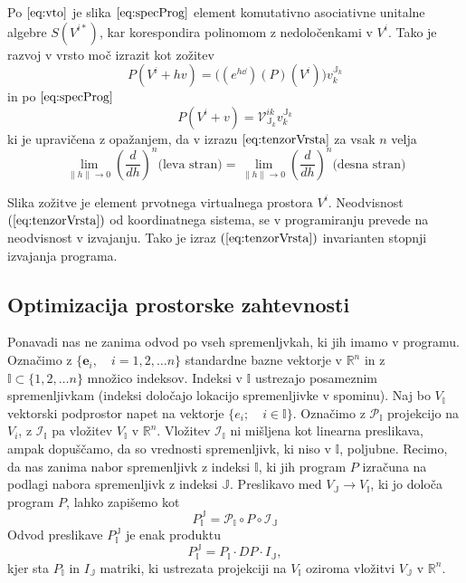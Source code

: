 \documentclass{article}
\newcommand{\RR}{\mathbb{R}}
\newcommand{\II}{\mathbb{I}}
\newcommand{\JJ}{\mathbb{J}}
\newcommand{\VV}{\mathcal{V}}
\newcommand{\e}{\mathbf{e}}
\begin{document}
  Po $\eqref{eq:vto}$ je slika $\eqref{eq:specProg}$ element komutativno asociativne unitalne algebre $S(V^{i*})$, kar korespondira polinomom z nedoločenkami v $V^i$. Tako je razvoj v vrsto moč izrazit kot zožitev
  \begin{equation}\label{eq:tenzorVrsta}
  	P(V^i+hv) = \Big((e^{h\dd})(P)(V^i)\Big)v^{\JJ_k}_{k}
  \end{equation}
  in po $\eqref{eq:specProg}$
  $$P(V^i+v) = \VV^{ik}_{\JJ_k}v^{\JJ_k}_{k}$$
 ki je upravičena z opažanjem, da v izrazu $\eqref{eq:tenzorVrsta}$ za vsak $n$ velja
 $$\lim\limits_{\lVert h\rVert\to 0}(\frac{d}{dh})^n\text{(leva stran)}=\lim\limits_{\lVert h\rVert\to 0}(\frac{d}{dh})^n\text{(desna stran)}$$
 
 Slika zožitve je element prvotnega virtualnega prostora $V^i$. Neodvisnost $(\ref{eq:tenzorVrsta})$ od koordinatnega sistema, se v programiranju prevede na neodvisnost v izvajanju. Tako je izraz $(\ref{eq:tenzorVrsta})$ invarianten stopnji izvajanja programa.   
 
 \subsection{Optimizacija prostorske zahtevnosti}
 Ponavadi nas ne zanima odvod po vseh spremenljvkah, ki jih imamo v programu.
 Označimo z $\{\e_i,\quad i=1,2,\ldots n\}$ standardne bazne vektorje v $\RR^n$ in z
 $\II\subset\{1,2,\ldots n\}$ množico indeksov. Indeksi v $\II$ ustrezajo
 posameznim spremenljivkam (indeksi določajo lokacijo spremenljivke v spominu). Naj bo $V_\II$ vektorski
 podprostor napet na vektorje $\{e_i;\quad i\in\II\}$. Označimo z 
 $\mathcal{P}_\II$ projekcijo na $V_i$, z $\mathcal{I}_\II$ pa vložitev $V_\II$ v
 $\RR^n$. Vložitev $\mathcal{I}_\II$ ni mišljena kot linearna preslikava, ampak
 dopuščamo, da so vrednosti spremenljivk, ki niso v $\II$, poljubne. Recimo, da nas zanima nabor spremenljivk z indeksi $\II$, ki jih
 program $P$ izračuna na podlagi nabora spremenljivk z indeksi $\mathbb{J}$.
 Preslikavo med $V_\JJ\to V_\II$, ki jo določa program $P$, lahko zapišemo kot
 \begin{equation}
   \label{eq:zozitev}
   P^{\JJ}_{\II}=\mathcal{P}_\II\circ P\circ \mathcal{I}_\JJ 
 \end{equation}
 Odvod preslikave $ P^{\JJ}_{\II}$ je enak produktu
 \begin{equation*}
   P^{\JJ}_{\II}=P_\II\cdot DP\cdot I_\JJ,   
 \end{equation*}
 kjer sta $P_\II$ in  $I_\JJ$ matriki, ki ustrezata projekciji na $V_\II$ oziroma
 vložitvi $V_\JJ$ v $\RR^n$.
 
\end{document}
